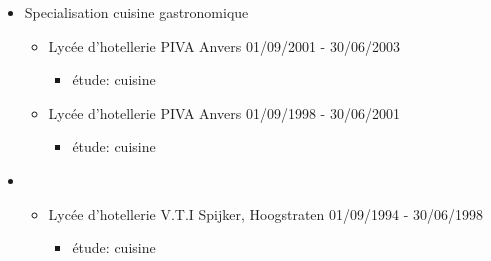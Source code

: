 \documentclass[10pt]{report}
\begin{document}
\begin{itemize}

\item Specialisation cuisine gastronomique

  \begin{itemize}
  \item Lyc\'{e}e d'hotellerie PIVA Anvers  \hfill 01/09/2001 - 30/06/2003
    \begin{itemize}
  	\item \'{e}tude: cuisine
    \end{itemize}
      \end{itemize}
      


  \begin{itemize}
  \item Lyc\'{e}e d'hotellerie PIVA Anvers  \hfill 01/09/1998 - 30/06/2001
    \begin{itemize}
  	\item \'{e}tude: cuisine
    \end{itemize}    
  \end{itemize}

\item 
  \begin{itemize}
  \item Lyc\'{e}e d'hotellerie V.T.I Spijker, Hoogstraten \hfill 01/09/1994 - 30/06/1998
    \begin{itemize}
  	\item \'{e}tude: cuisine
    \end{itemize}    
  \end{itemize}
\end{itemize}
\end{document}
